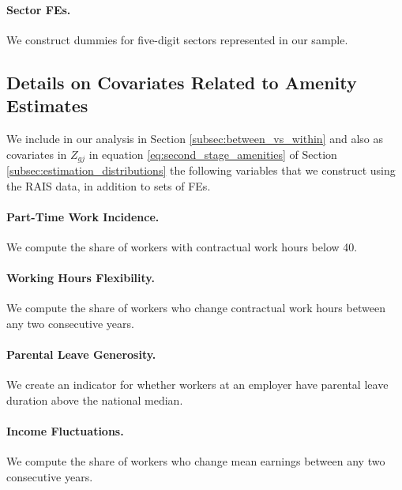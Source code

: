 \paragraph{Sector FEs.}

We construct dummies for {\NSectors} five-digit sectors represented in our sample.


\subsection{Details on Covariates Related to Amenity Estimates\label{app:estimation_amenity_covariates}}

We include in our analysis in Section \ref{subsec:between_vs_within} and also as covariates in $Z_{gj}$ in equation \eqref{eq:second_stage_amenities} of Section \ref{subsec:estimation_distributions} the following {\NAmenityCovariates} variables that we construct using the RAIS data, in addition to {\NDummies} sets of FEs.


\paragraph{Part-Time Work Incidence.}

We compute the share of workers with contractual work hours below 40.


\paragraph{Working Hours Flexibility.}

We compute the share of workers who change contractual work hours between any two consecutive years.


\paragraph{Parental Leave Generosity.}

We create an indicator for whether workers at an employer have parental leave duration above the national median.


\paragraph{Income Fluctuations.}

We compute the share of workers who change mean earnings between any two consecutive years.


